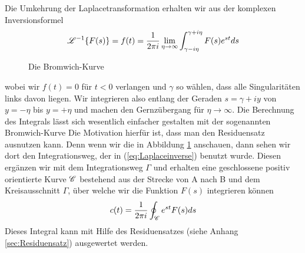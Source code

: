Die Umkehrung der Laplacetransformation erhalten wir aus der komplexen
Inversionsformel
\begin{equation}\label{eq:Laplaceinverse}
  {\cal L}^{-1}\{F(s)\}=f(t)=\frac{1}{2\pi i}\lim_{\eta\rightarrow\infty}
\int_{\gamma-i\eta}^{\gamma+i\eta} F(s) e^{st}ds
\end{equation}
%
\begin{figure}[ht]
\centering
{}
\caption{\label{fig:Bromwich}Die Bromwich-Kurve}
\end{figure}
wobei wir $f(t)=0$ für $t<0$ verlangen und $\gamma$ so wählen, dass alle
Singularitäten links davon liegen. Wir integrieren also entlang der Geraden
$s=\gamma+iy$ von $y=-\eta$ bis $y=+\eta$ und machen den Gernzübergang für
$\eta\rightarrow\infty$. Die Berechnung des Integrals lässt sich wesentlich
einfacher gestalten mit der sogenannten Bromwich-Kurve Die Motivation hierfür
ist, dass man den Residuensatz ausnutzen kann. Denn wenn wir die in Abbildung
\ref{fig:Bromwich} anschauen, dann sehen wir dort den Integrationsweg, der in
(\ref{eq:Laplaceinverse}) benutzt wurde. Diesen ergänzen wir mit dem
Integrationsweg $\Gamma$ und erhalten eine geschlossene positiv orientierte
Kurve $\cal C$ bestehend aus der Strecke von A nach B und dem Kreisausschnitt
$\Gamma$, über welche wir die Funktion $F(s)$ integrieren können
\begin{equation}\label{eq:Kreisintegral}
c(t)=\frac{1}{2\pi i}\oint_{\cal C}e^{st}F(s)ds
\end{equation}
Dieses Integral kann mit Hilfe des Residuensatzes (siehe Anhang \ref{sec:Residuensatz}) ausgewertet werden.  
